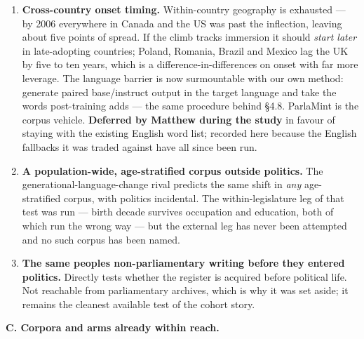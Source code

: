 \begin{enumerate}
\def\labelenumi{\arabic{enumi}.}
\setcounter{enumi}{8}
\tightlist
\item
  \textbf{Cross-country onset timing.} Within-country geography is exhausted --- by
  2006 everywhere in Canada and the US was past the inflection, leaving about
  five points of spread. If the climb tracks immersion it should \emph{start later}
  in late-adopting countries; Poland, Romania, Brazil and Mexico lag the UK by
  five to ten years, which is a difference-in-differences on onset with far
  more leverage. The language barrier is now surmountable with our own method:
  generate paired base/instruct output in the target language and take the
  words post-training adds --- the same procedure behind §4.8. ParlaMint is the
  corpus vehicle. \textbf{Deferred by Matthew during the study} in favour of
  staying with the existing English word list; recorded here because the
  English fallbacks it was traded against have all since been run.
\item
  \textbf{A population-wide, age-stratified corpus outside politics.} The
  generational-language-change rival predicts the same shift in \emph{any}
  age-stratified corpus, with politics incidental. The within-legislature leg
  of that test was run --- birth decade survives occupation and education, both
  of which run the wrong way --- but the external leg has never been attempted
  and no such corpus has been named.
\item
  \textbf{The same people\textquotesingle s non-parliamentary writing before they entered
  politics.} Directly tests whether the register is acquired before political
  life. Not reachable from parliamentary archives, which is why it was set
  aside; it remains the cleanest available test of the cohort story.
\end{enumerate}

\textbf{C. Corpora and arms already within reach.}

